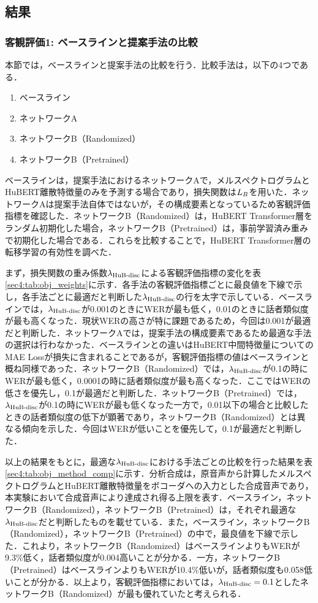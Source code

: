\subsection{結果}
\subsubsection{客観評価1: ベースラインと提案手法の比較}
\label{sec4:sec:obj_1}
本節では，ベースラインと提案手法の比較を行う．比較手法は，以下の4つである．
\begin{enumerate}
    \item ベースライン
    \item ネットワークA
    \item ネットワークB（Randomized）
    \item ネットワークB（Pretrained）
\end{enumerate}
ベースラインは，提案手法におけるネットワークAで，メルスペクトログラムとHuBERT離散特徴量のみを予測する場合であり，損失関数は$L_{B}$を用いた．ネットワークAは提案手法自体ではないが，その構成要素となっているため客観評価指標を確認した．ネットワークB（Randomized）は，HuBERT Transformer層をランダム初期化した場合，ネットワークB（Pretrained）は，事前学習済み重みで初期化した場合である．これらを比較することで，HuBERT Transformer層の転移学習の有効性を調べた．

まず，損失関数の重み係数$\lambda_{\text{HuB-disc}}$による客観評価指標の変化を表\ref{sec4:tab:obj_weights}に示す．各手法の客観評価指標ごとに最良値を下線で示し，各手法ごとに最適だと判断した$\lambda_{\text{HuB-disc}}$の行を太字で示している．ベースラインでは，$\lambda_{\text{HuB-disc}}$が0.001のときにWERが最も低く，0.01のときに話者類似度が最も高くなった．現状WERの高さが特に課題であるため，今回は0.001が最適だと判断した．ネットワークAでは，提案手法の構成要素であるため最適な手法の選択は行わなかった．ベースラインとの違いはHuBERT中間特徴量についてのMAE Lossが損失に含まれることであるが，客観評価指標の値はベースラインと概ね同様であった．ネットワークB（Randomized）では，$\lambda_{\text{HuB-disc}}$が0.1の時にWERが最も低く，0.0001の時に話者類似度が最も高くなった．ここではWERの低さを優先し，0.1が最適だと判断した．ネットワークB（Pretrained）では，$\lambda_{\text{HuB-disc}}$が0.1の時にWERが最も低くなった一方で，0.01以下の場合と比較したときの話者類似度の低下が顕著であり，ネットワークB（Randomized）とは異なる傾向を示した．今回はWERが低いことを優先して，0.1が最適だと判断した．

以上の結果をもとに，最適な$\lambda_{\text{HuB-disc}}$における手法ごとの比較を行った結果を表\ref{sec4:tab:obj_method_comp}に示す．分析合成は，原音声から計算したメルスペクトログラムとHuBERT離散特徴量をボコーダへの入力とした合成音声であり，本実験において合成音声により達成され得る上限を表す．ベースライン，ネットワークB（Randomized），ネットワークB（Pretrained）は，それぞれ最適な$\lambda_{\text{HuB-disc}}$だと判断したものを載せている．また，ベースライン，ネットワークB（Randomized），ネットワークB（Pretrained）の中で，最良値を下線で示した．これより，ネットワークB（Randomized）はベースラインよりもWERが9.3\%低く，話者類似度が0.004高いことが分かる．一方，ネットワークB（Pretrained）はベースラインよりもWERが10.4\%低いが，話者類似度も0.058低いことが分かる．以上より，客観評価指標においては，$\lambda_{\text{HuB-disc}} = 0.1$としたネットワークB（Randomized）が最も優れていたと考えられる．

